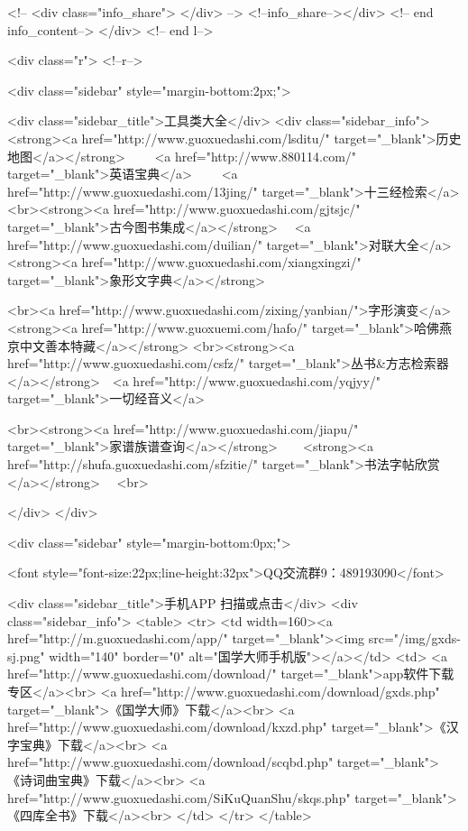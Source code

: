  <!--
<div class="info_share">
</div> 
-->
 <!--info_share--></div>   <!-- end info_content-->
  </div> <!-- end l-->

<div class="r">   <!--r-->



<div class="sidebar"  style="margin-bottom:2px;">

 
<div class="sidebar_title">工具类大全</div>
<div class="sidebar_info">
<strong><a href="http://www.guoxuedashi.com/lsditu/" target="_blank">历史地图</a></strong>　　
<a href="http://www.880114.com/" target="_blank">英语宝典</a>　　
<a href="http://www.guoxuedashi.com/13jing/" target="_blank">十三经检索</a>　
<br><strong><a href="http://www.guoxuedashi.com/gjtsjc/" target="_blank">古今图书集成</a></strong>　
<a href="http://www.guoxuedashi.com/duilian/" target="_blank">对联大全</a>　<strong><a href="http://www.guoxuedashi.com/xiangxingzi/" target="_blank">象形文字典</a></strong>　

<br><a href="http://www.guoxuedashi.com/zixing/yanbian/">字形演变</a>　　<strong><a href="http://www.guoxuemi.com/hafo/" target="_blank">哈佛燕京中文善本特藏</a></strong>
<br><strong><a href="http://www.guoxuedashi.com/csfz/" target="_blank">丛书&方志检索器</a></strong>　<a href="http://www.guoxuedashi.com/yqjyy/" target="_blank">一切经音义</a>　　

<br><strong><a href="http://www.guoxuedashi.com/jiapu/" target="_blank">家谱族谱查询</a></strong>　　<strong><a href="http://shufa.guoxuedashi.com/sfzitie/" target="_blank">书法字帖欣赏</a></strong>　
<br>

</div>
</div>


<div class="sidebar" style="margin-bottom:0px;">

<font style="font-size:22px;line-height:32px">QQ交流群9：489193090</font>


<div class="sidebar_title">手机APP 扫描或点击</div>
<div class="sidebar_info">
<table>
<tr>
	<td width=160><a href="http://m.guoxuedashi.com/app/" target="_blank"><img src="/img/gxds-sj.png" width="140"  border="0" alt="国学大师手机版"></a></td>
	<td>
<a href="http://www.guoxuedashi.com/download/" target="_blank">app软件下载专区</a><br>
<a href="http://www.guoxuedashi.com/download/gxds.php" target="_blank">《国学大师》下载</a><br>
<a href="http://www.guoxuedashi.com/download/kxzd.php" target="_blank">《汉字宝典》下载</a><br>
<a href="http://www.guoxuedashi.com/download/scqbd.php" target="_blank">《诗词曲宝典》下载</a><br>
<a href="http://www.guoxuedashi.com/SiKuQuanShu/skqs.php" target="_blank">《四库全书》下载</a><br>
</td>
</tr>
</table>

